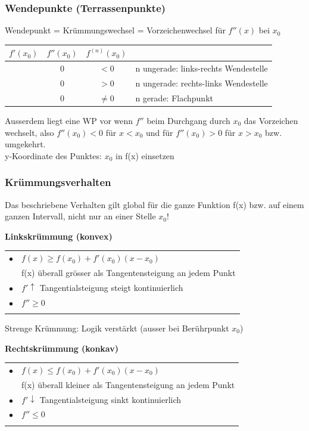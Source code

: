 			
			\subsubsection{Wendepunkte (Terrassenpunkte)}
			Wendepunkt = Krümmungswechsel = Vorzeichenwechsel für $f''(x)$ bei $x_0$ \\
			
			\begin{tabular}{| c | c | c | l |}
			\hline
			$f'(x_0)$ & $f''(x_0)$ & $f^{(n)}(x_0)$ & \\
			\hline
			 & 0 & $ < 0$ & n ungerade: links-rechts Wendestelle \\
			\hline
			 & 0 & $ > 0$ & n ungerade: rechts-links Wendestelle \\
			\hline
			 & 0 & $\neq 0$ & n gerade: Flachpunkt \\
			\hline
			\end{tabular}
			
			Ausserdem liegt eine WP vor wenn $f''$ beim Durchgang durch $x_0$ das Vorzeichen wechselt, also $f''(x_0) < 0$ für $x < x_0$ und für $f''(x_0) > 0$ für $x > x_0$ bzw. umgekehrt.\\
			
			y-Koordinate des Punktes: $x_0$ in f(x) einsetzen		


			\subsubsection{Krümmungsverhalten} 
			Das beschriebene Verhalten gilt global für die ganze Funktion f(x) bzw. auf einem ganzen Intervall, nicht nur an einer Stelle $x_0$!
			
			\textbf{Linkskrümmung (konvex)}\\
			\begin{tabular}{ll}
			$\bullet$ & $f(x) \geq f(x_0) + f'(x_0)(x-x_0)$ \\
			& f(x) überall grösser als Tangentensteigung an jedem Punkt \\
			$\bullet$ & $f' \uparrow$ Tangentialsteigung steigt kontinuierlich \\
			$\bullet$ & $f'' \geq 0$ \\
			\\
			\end{tabular}
			
			Strenge Krümmung: Logik verstärkt (ausser bei Berührpunkt $x_0$)
			
			\textbf{Rechtskrümmung (konkav)}\\
			\begin{tabular}{ll}
			$\bullet$ & $f(x) \leq f(x_0) + f'(x_0)(x-x_0)$ \\
			& f(x) überall kleiner als Tangentensteigung an jedem Punkt \\
			$\bullet$ & $f' \downarrow$ Tangentialsteigung sinkt kontinuierlich \\
			$\bullet$ & $f'' \leq 0$ \\
			\\
			\end{tabular}
			
